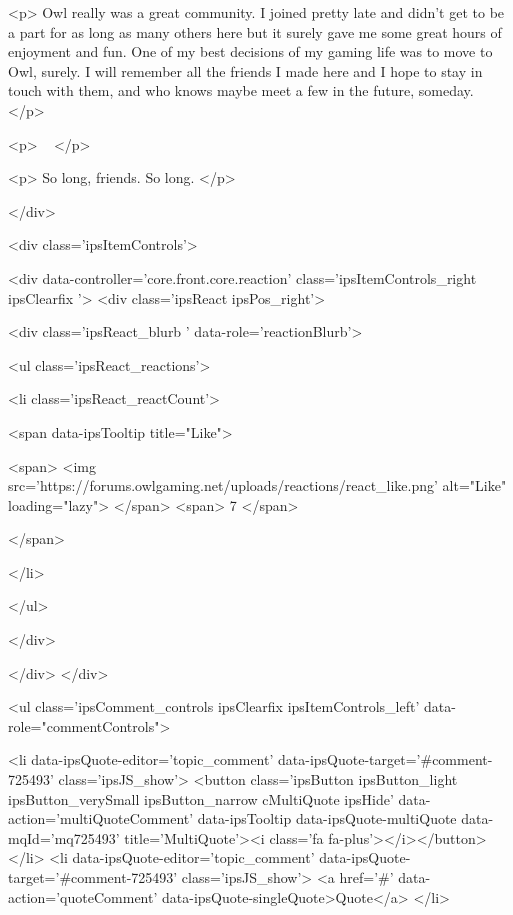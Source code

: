 <p>
	Owl really was a great community. I joined pretty late and didn't get to be a part for as long as many others here but it surely gave me some great hours of enjoyment and fun. One of my best decisions of my gaming life was to move to Owl, surely. I will remember all the friends I made here and I hope to stay in touch with them, and who knows maybe meet a few in the future, someday.
</p>

<p>
	 
</p>

<p>
	So long, friends. So long.
</p>


			
		</div>

		
			<div class='ipsItemControls'>
				
					
						

	<div data-controller='core.front.core.reaction' class='ipsItemControls_right ipsClearfix '>	
		<div class='ipsReact ipsPos_right'>
			
				
				<div class='ipsReact_blurb ' data-role='reactionBlurb'>
					
						

	
	<ul class='ipsReact_reactions'>
		
		
			
				
				<li class='ipsReact_reactCount'>
					
						<span data-ipsTooltip title="Like">
					
							<span>
								<img src='https://forums.owlgaming.net/uploads/reactions/react_like.png' alt="Like" loading="lazy">
							</span>
							<span>
								7
							</span>
					
						</span>
					
				</li>
			
		
	</ul>

					
				</div>
			
			
			
		</div>
	</div>

					
				
				<ul class='ipsComment_controls ipsClearfix ipsItemControls_left' data-role="commentControls">
					
						
							<li data-ipsQuote-editor='topic_comment' data-ipsQuote-target='#comment-725493' class='ipsJS_show'>
								<button class='ipsButton ipsButton_light ipsButton_verySmall ipsButton_narrow cMultiQuote ipsHide' data-action='multiQuoteComment' data-ipsTooltip data-ipsQuote-multiQuote data-mqId='mq725493' title='MultiQuote'><i class='fa fa-plus'></i></button>
							</li>
							<li data-ipsQuote-editor='topic_comment' data-ipsQuote-target='#comment-725493' class='ipsJS_show'>
								<a href='#' data-action='quoteComment' data-ipsQuote-singleQuote>Quote</a>
							</li>
						
